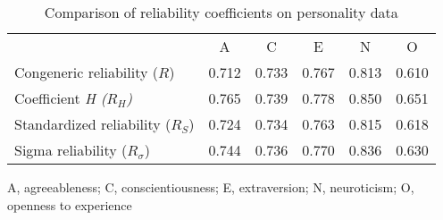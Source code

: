 \begin{table}[ht]
\centering
\caption{Comparison of reliability coefficients on personality data} 
\label{tab:reliabilites}
\begin{tabular}{lccccc}
  \toprule
 & A & C & E & N & O \\ 
  \cmidrule{1-6}
Congeneric reliability ($R$) & 0.712 & 0.733 & 0.767 & 0.813 & 0.610 \\ 
  Coefficient \it{H} ($R_H$) & 0.765 & 0.739 & 0.778 & 0.850 & 0.651 \\ 
  Standardized reliability ($R_S$) & 0.724 & 0.734 & 0.763 & 0.815 & 0.618 \\ 
  Sigma reliability ($R_\sigma$) & 0.744 & 0.736 & 0.770 & 0.836 & 0.630 \\ 
   \bottomrule
\end{tabular}
  \vskip7.0pt
A, agreeableness; C, conscientiousness; E, extraversion; N, neuroticism; O, openness to experience 
\end{table}
